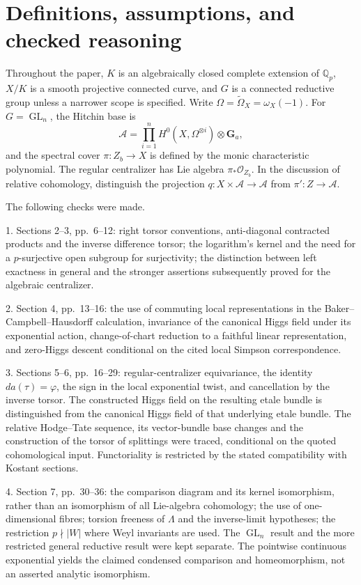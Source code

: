 \documentclass[10pt]{article}
\begin{document}
\section*{Definitions, assumptions, and checked reasoning}
Throughout the paper, \(K\) is an algebraically closed complete extension of \(\mathbb Q_p\), \(X/K\) is a smooth projective connected curve, and \(G\) is a connected reductive group unless a narrower scope is specified. Write \(\Omega=\widetilde\Omega_X=\omega_X(-1)\). For \(G=\operatorname{GL}_n\), the Hitchin base is \[\mathcal A=\prod_{i=1}^n H^0(X,\Omega^{\otimes i})\otimes\mathbf G_a,\] and the spectral cover \(\pi:Z_b\to X\) is defined by the monic characteristic polynomial. The regular centralizer has Lie algebra \(\pi_*\mathcal O_{Z_b}\). In the discussion of relative cohomology, distinguish the projection \(q:X\times\mathcal A\to\mathcal A\) from \(\pi':Z\to\mathcal A\).\par
The following checks were made.\par
1. Sections 2–3, pp. 6–12: right torsor conventions, anti-diagonal contracted products and the inverse difference torsor; the logarithm’s kernel and the need for a \(p\)-surjective open subgroup for surjectivity; the distinction between left exactness in general and the stronger assertions subsequently proved for the algebraic centralizer.\par
2. Section 4, pp. 13–16: the use of commuting local representations in the Baker–Campbell–Hausdorff calculation, invariance of the canonical Higgs field under its exponential action, change-of-chart reduction to a faithful linear representation, and zero-Higgs descent conditional on the cited local Simpson correspondence.\par
3. Sections 5–6, pp. 16–29: regular-centralizer equivariance, the identity \(d a(\tau)=\varphi\), the sign in the local exponential twist, and cancellation by the inverse torsor. The constructed Higgs field on the resulting etale bundle is distinguished from the canonical Higgs field of that underlying etale bundle. The relative Hodge–Tate sequence, its vector-bundle base changes and the construction of the torsor of splittings were traced, conditional on the quoted cohomological input. Functoriality is restricted by the stated compatibility with Kostant sections.\par
4. Section 7, pp. 30–36: the comparison diagram and its kernel isomorphism, rather than an isomorphism of all Lie-algebra cohomology; the use of one-dimensional fibres; torsion freeness of \(\Lambda\) and the inverse-limit hypotheses; the restriction \(p\nmid |W|\) where Weyl invariants are used. The \(\operatorname{GL}_n\) result and the more restricted general reductive result were kept separate. The pointwise continuous exponential yields the claimed condensed comparison and homeomorphism, not an asserted analytic isomorphism.\par
\end{document}
